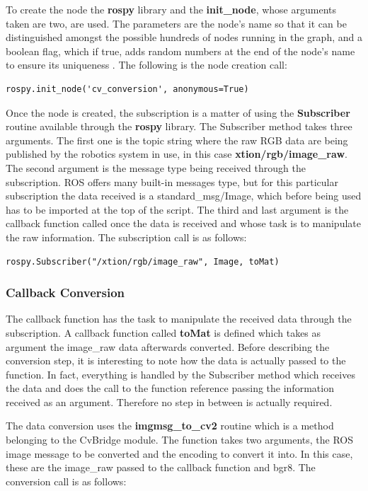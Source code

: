 To create the node the \textbf{rospy} library and the \textbf{init\_node}, whose arguments taken are two, are used. The parameters are the node's name so that it can be distinguished amongst the possible hundreds of nodes running in the graph, and a boolean flag, which if true, adds random numbers at the end of the node's name to ensure its uniqueness \cite{website:nodes}. The following is the node creation call:

\begin{lstlisting}
rospy.init_node('cv_conversion', anonymous=True)
\end{lstlisting}

Once the node is created, the subscription is a matter of using the \textbf{Subscriber} routine available through the \textbf{rospy} library. The Subscriber method takes three arguments. The first one is the topic string where the raw RGB data are being published by the robotics system in use, in this case \textbf{xtion/rgb/image\_raw}. The second argument is the message type being received through the subscription. ROS offers many built-in messages type, but for this particular subscription the data received is a standard\_msg/Image, which before being used has to be imported at the top of the script. The third and last argument is the callback function called once the data is received and whose task is to manipulate the raw information. The subscription call is as follows:

\begin{lstlisting}
rospy.Subscriber("/xtion/rgb/image_raw", Image, toMat)
\end{lstlisting}

\subsubsection{Callback Conversion}

The callback function has the task to manipulate the received data through the subscription. A callback function called \textbf{toMat} is defined which takes as argument the image\_raw data afterwards converted. Before describing the conversion step, it is interesting to note how the data is actually passed to the function. In fact, everything is handled by the Subscriber method which receives the data and does the call to the function reference passing the information received as an argument. Therefore no step in between is actually required.

The data conversion uses the \textbf{imgmsg\_to\_cv2} routine which is a method belonging to the CvBridge module. The function takes two arguments, the ROS image message to be converted and the encoding to convert it into. In this case, these are the image\_raw passed to the callback function and bgr8. The conversion call is as follows:

